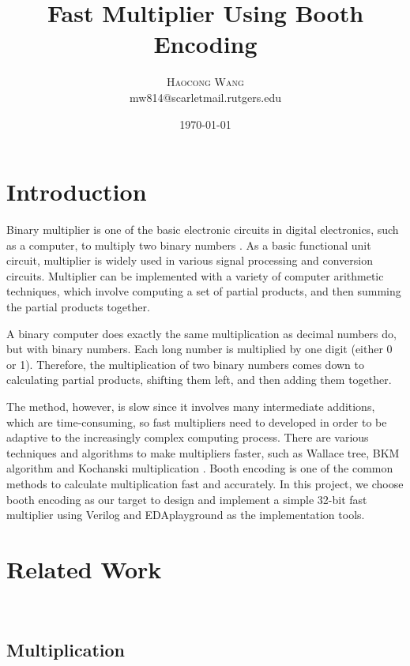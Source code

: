 \documentclass[twoside,twocolumn]{article}
\title{Fast Multiplier Using Booth Encoding} %
\author{%
\textsc{Haocong Wang} \\[1ex] %
\normalsize {mw814@scarletmail.rutgers.edu} %
}
\date{\today} %
\begin{document}
\maketitle


\section{Introduction}

Binary multiplier is one of the basic electronic circuits in digital electronics, such as a computer, to multiply two binary numbers \cite{bi_mul}. As a basic functional unit circuit, multiplier is widely used in various signal processing and conversion circuits. Multiplier can be implemented with a variety of computer arithmetic techniques, which involve computing a set of partial products, and then summing the partial products together.

A binary computer does exactly the same multiplication as decimal numbers do, but with binary numbers. Each long number is multiplied by one digit (either 0 or 1). Therefore, the multiplication of two binary numbers comes down to calculating partial products, shifting them left, and then adding them together.

The method, however, is slow since it involves many intermediate additions, which are time-consuming, so fast multipliers need to developed in order to be adaptive to the increasingly complex computing process. There are various techniques and algorithms to make multipliers faster, such as Wallace tree, BKM algorithm and Kochanski multiplication \cite{bi_mul}. Booth encoding is one of the common methods to calculate multiplication fast and accurately. In this project, we choose booth encoding as our target to design and implement a simple 32-bit fast multiplier using Verilog and EDAplayground as the implementation tools.


\section{Related Work}~\label{sec:related}

\subsection{Multiplication}
\end{document}

